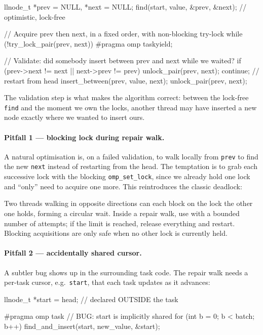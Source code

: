 \begin{codeblock}[language = C, morekeywords={pragma}]
llnode_t *prev = NULL, *next = NULL;
find(start, value, &prev, &next);             // optimistic, lock-free

// Acquire prev then next, in a fixed order, with non-blocking try-lock
while (!try_lock_pair(prev, next))
    #pragma omp taskyield;

// Validate: did somebody insert between prev and next while we waited?
if (prev->next != next || next->prev != prev) {
    unlock_pair(prev, next);
    continue;                                 // restart from head
}
insert_between(prev, value, next);
unlock_pair(prev, next);
\end{codeblock}

The validation step is what makes the algorithm correct: between the lock-free \texttt{find} and the moment we own the locks, another thread may have inserted a new node exactly where we wanted to insert ours.

\paragraph{Pitfall 1 --- blocking lock during repair walk.} A natural optimisation is, on a failed validation, to walk locally from \texttt{prev} to find the new \texttt{next} instead of restarting from the head. The temptation is to grab each successive lock with the blocking \texttt{omp\_set\_lock}, since we already hold one lock and ``only'' need to acquire one more. This reintroduces the classic deadlock:

\begin{warningblock}
Two threads walking in opposite directions can each block on the lock the other one holds, forming a circular wait. Inside a repair walk, use  with a bounded number of attempts; if the limit is reached, release everything and restart. Blocking acquisitions are only safe when no other lock is currently held.
\end{warningblock}

\paragraph{Pitfall 2 --- accidentally shared cursor.} A subtler bug shows up in the surrounding task code. The repair walk needs a per-task cursor, e.g.\ \texttt{start}, that each task updates as it advances:

\begin{codeblock}[language = C, morekeywords={pragma}]
llnode_t *start = head;          // declared OUTSIDE the task

#pragma omp task                 // BUG: start is implicitly shared
{
    for (int b = 0; b < batch; b++)
        find_and_insert(start, new_value, &start);
}
\end{codeblock}

